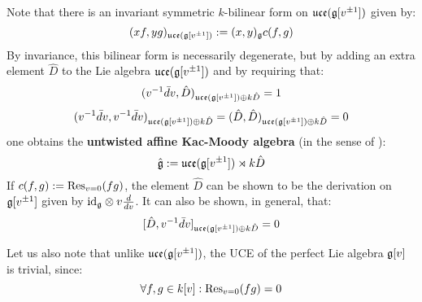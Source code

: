 \begin{example}
            Note that there is an invariant symmetric $k$-bilinear form on $\mathfrak{uce}(\mathfrak{g}[v^{\pm 1}])$ given by:
                $$(x f, y g)_{\mathfrak{uce}(\mathfrak{g}[v^{\pm 1}])} := (x, y)_{\mathfrak{g}} c(f, g)$$
            By invariance, this bilinear form is necessarily degenerate, but by adding an extra element $\hat{D}$ to the Lie algebra $\mathfrak{uce}(\mathfrak{g}[v^{\pm 1}])$ and by requiring that:
                $$(v^{-1} \bar{d}v, \hat{D})_{\mathfrak{uce}(\mathfrak{g}[v^{\pm 1}]) \oplus k \hat{D}} = 1$$
                $$(v^{-1} \bar{d}v, v^{-1} \bar{d}v)_{\mathfrak{uce}(\mathfrak{g}[v^{\pm 1}]) \oplus k \hat{D}} = (\hat{D}, \hat{D})_{\mathfrak{uce}(\mathfrak{g}[v^{\pm 1}]) \oplus k \hat{D}} = 0$$
            one obtains the \textbf{untwisted affine Kac-Moody algebra} (in the sense of \cite[Chapter 7]{kac_infinite_dimensional_lie_algebras}):
                $$\hat{\mathfrak{g}} := \mathfrak{uce}(\mathfrak{g}[v^{\pm 1}]) \rtimes k \hat{D}$$
            If $c(f, g) := \mathrm{Res}_{v = 0}(fg)$, the element $\hat{D}$ can be shown to be the derivation on $\mathfrak{g}[v^{\pm 1}]$ given by $\id_{\g} \tensor v \frac{d}{dv}$. It can also be shown, in general, that:
                $$[\hat{D}, v^{-1} \bar{d}v]_{\mathfrak{uce}(\mathfrak{g}[v^{\pm 1}]) \oplus k \hat{D}} = 0$$

            Let us also note that unlike $\mathfrak{uce}(\mathfrak{g}[v^{\pm 1}])$, the UCE of the perfect Lie algebra $\mathfrak{g}[v]$ is trivial, since:
                $$\forall f, g \in k[v]: \mathrm{Res}_{v = 0}(fg) = 0$$
        \end{example}
